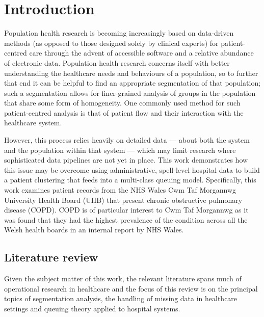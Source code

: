 \section{Introduction}\label{sec:intro}

Population health research is becoming increasingly based on data-driven methods
(as opposed to those designed solely by clinical experts) for patient-centred
care through the advent of accessible software and a relative abundance of
electronic data. Population health research concerns itself with better
understanding the healthcare needs and behaviours of a population, so to further
that end it can be helpful to find an appropriate segmentation of that
population; such a segmentation allows for finer-grained analysis of groups in
the population that share some form of homogeneity. One commonly used method for
such patient-centred analysis is that of patient flow and their interaction with
the healthcare system.

However, this process relies heavily on detailed data --- about both the system
and the population within that system --- which may limit research where
sophisticated data pipelines are not yet in place. This work demonstrates how
this issue may be overcome using administrative, spell-level hospital data to
build a patient clustering that feeds into a multi-class queuing model.
Specifically, this work examines patient records from the NHS Wales Cwm Taf
Morgannwg University Health Board (UHB) that present chronic obstructive
pulmonary disease (COPD). COPD is of particular interest to Cwm Taf Morgannwg as
it was found that they had the highest prevalence of the condition across all
the Welsh health boards in an internal report by NHS Wales.



\subsection{Literature review}\label{subsec:review}

Given the subject matter of this work, the relevant literature spans much of
operational research in healthcare and the focus of this review is on the
principal topics of segmentation analysis, the handling of missing data in
healthcare settings and queuing theory applied to hospital systems.

